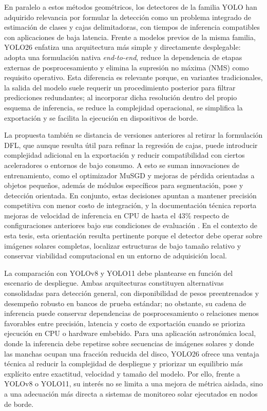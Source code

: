 En paralelo a estos métodos geométricos, los detectores de la familia YOLO han adquirido relevancia por formular la detección como un problema integrado de estimación de clases y cajas delimitadoras, con tiempos de inferencia compatibles con aplicaciones de baja latencia. Frente a modelos previos de la misma familia, YOLO26 enfatiza una arquitectura más simple y directamente desplegable: adopta una formulación nativa \textit{end-to-end}, reduce la dependencia de etapas externas de posprocesamiento y elimina la supresión no máxima (NMS) como requisito operativo. Esta diferencia es relevante porque, en variantes tradicionales, la salida del modelo suele requerir un procedimiento posterior para filtrar predicciones redundantes; al incorporar dicha resolución dentro del propio esquema de inferencia, se reduce la complejidad operacional, se simplifica la exportación y se facilita la ejecución en dispositivos de borde.

La propuesta también se distancia de versiones anteriores al retirar la formulación DFL, que aunque resulta útil para refinar la regresión de cajas, puede introducir complejidad adicional en la exportación y reducir compatibilidad con ciertos aceleradores o entornos de bajo consumo. A esto se suman innovaciones de entrenamiento, como el optimizador MuSGD y mejoras de pérdida orientadas a objetos pequeños, además de módulos específicos para segmentación, pose y detección orientada. En conjunto, estas decisiones apuntan a mantener precisión competitiva con menor costo de integración, y la documentación técnica reporta mejoras de velocidad de inferencia en CPU de hasta el 43\% respecto de configuraciones anteriores bajo sus condiciones de evaluación \citep{ultralyticsYOLO26}. En el contexto de esta tesis, esta orientación resulta pertinente porque el detector debe operar sobre imágenes solares completas, localizar estructuras de bajo tamaño relativo y conservar viabilidad computacional en un entorno de adquisición local.

La comparación con YOLOv8 y YOLO11 debe plantearse en función del escenario de despliegue. Ambas arquitecturas constituyen alternativas consolidadas para detección general, con disponibilidad de pesos preentrenados y desempeño robusto en bancos de prueba estándar; no obstante, su cadena de inferencia puede conservar dependencias de posprocesamiento o relaciones menos favorables entre precisión, latencia y costo de exportación cuando se prioriza ejecución en CPU o hardware embebido. Para una aplicación astronómica local, donde la inferencia debe repetirse sobre secuencias de imágenes solares y donde las manchas ocupan una fracción reducida del disco, YOLO26 ofrece una ventaja técnica al reducir la complejidad de despliegue y priorizar un equilibrio más explícito entre exactitud, velocidad y tamaño del modelo. Por ello, frente a YOLOv8 o YOLO11, su interés no se limita a una mejora de métrica aislada, sino a una adecuación más directa a sistemas de monitoreo solar ejecutados en nodos de borde.

